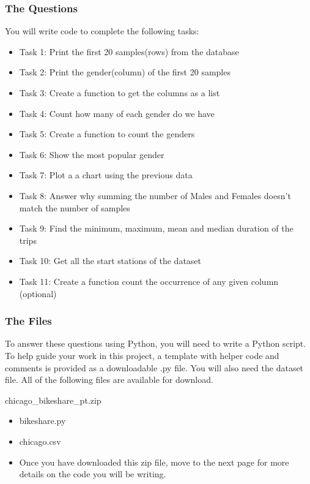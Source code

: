\documentclass[]{book}
\providecommand{\tightlist}{%
  \setlength{\itemsep}{0pt}\setlength{\parskip}{0pt}}
\begin{document}
\subsubsection{The Questions}\label{the-questions}

You will write code to complete the following tasks:

\begin{itemize}
\tightlist
\item
  Task 1: Print the first 20 samples(rows) from the database
\item
  Task 2: Print the gender(column) of the first 20 samples
\item
  Task 3: Create a function to get the columns as a list
\item
  Task 4: Count how many of each gender do we have
\item
  Task 5: Create a function to count the genders
\item
  Task 6: Show the most popular gender
\item
  Task 7: Plot a a chart using the previous data
\item
  Task 8: Answer why summing the number of Males and Females doesn't
  match the number of samples
\item
  Task 9: Find the minimum, maximum, mean and median duration of the
  trips
\item
  Task 10: Get all the start stations of the dataset
\item
  Task 11: Create a function count the occurrence of any given column
  (optional)
\end{itemize}

\subsubsection{The Files}\label{the-files}

To answer these questions using Python, you will need to write a Python
script. To help guide your work in this project, a template with helper
code and comments is provided as a downloadable .py file. You will also
need the dataset file. All of the following files are available for
download.

chicago\_bikeshare\_pt.zip

\begin{itemize}
\tightlist
\item
  bikeshare.py
\item
  chicago.csv
\item
  Once you have downloaded this zip file, move to the next page for more
  details on the code you will be writing.
\end{itemize}
\end{document}
